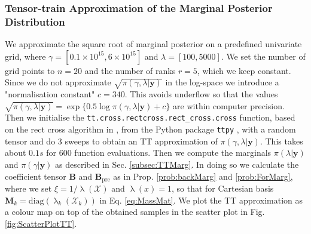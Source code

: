 \subsubsection{Tensor-train Approximation of the Marginal Posterior Distribution}
\label{subsec:firstMargTT}
We approximate the square root of marginal posterior on a predefined univariate grid, where $\gamma = [ 0.1 \times 10^{15}, 6 \times 10^{15}]$ and $\lambda = [ 100, 5000]$.
We set the number of grid points to $n = 20$ and the number of ranks $r = 5$, which we keep constant.
Since we do not approximate $\sqrt{ \pi(\gamma, \lambda| \bm{y}) }$ in the log-space we introduce a "normalisation constant" $c = 340$. This avoids underflow so that the values $\sqrt{\pi(\gamma, \lambda| \bm{y})} = \exp \{ 0.5 \log  \pi(\gamma, \lambda| \bm{y}) + c \} $ are within computer precision.
Then we initialise the \texttt{tt.cross.rectcross.rect\_cross.cross} function, based on the rect cross algorithm in \cite{OSELEDETS2010TTCross}, from the Python package \texttt{ttpy} \cite{Oseledets2018ttpy}, with a random tensor and do 3 sweeps to obtain an TT approximation of $\pi(\gamma, \lambda| \bm{y})$.
This takes about $0.1s$ for $600$ function evaluations.
Then we compute the marginals $\pi(\lambda| \bm{y})$ and $\pi(\gamma| \bm{y})$ as described in Sec. \ref{subsec:TTMarg}.
In doing so we calculate the coefficient tensor $\bm{B}$ and $\bm{B}_{\text{pre}}$ as in Prop. \ref{prob:backMarg} and \ref{prob:ForMarg}, where we set $\xi = 1 / \uplambda (\mathcal{X})$ and $\uplambda(x) = 1$, so that for Cartesian basis $\bm{M}_k = \text{diag}(\uplambda_k(\mathcal{X}_k))$ in Eq. \ref{eq:MassMat}.
We plot the TT approximation as a colour map on top of the obtained samples in the scatter plot in Fig. \ref{fig:ScatterPlotTT}.

